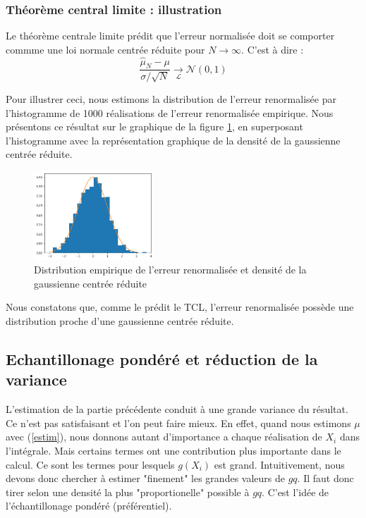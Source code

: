\documentclass{article}
\begin{document}
\subsubsection{Théorème central limite : illustration}

Le théorème centrale limite prédit que l'erreur normalisée doit se comporter commme une loi 
normale centrée réduite pour $N \rightarrow \infty$. C'est à dire : 
\[\frac {\hat{\mu}_{N}-\mu }{\sigma /{\sqrt {N}}}\underset{\mathcal{L} }{\longrightarrow}\mathcal{N} (0,1)\]

Pour illustrer ceci, nous estimons la distribution de l'erreur renormalisée
par l'histogramme de 1000 réalisations de l'erreur renormalisée empirique. Nous présentons
ce résultat sur le graphique de la figure \ref{TP1_MC_TCL}, en superposant l'histogramme avec la représentation graphique de la densité de la gaussienne centrée réduite.
\begin{figure}[ht]
\centering
\includegraphics[width=0.4\textwidth]{TP1/MC_brute_TCL.png}
\caption{Distribution empirique de l'erreur renormalisée et densité de la gaussienne centrée réduite}
\label{TP1_MC_TCL}
\end{figure}

Nous constatons que, comme le prédit le TCL, l'erreur renormalisée possède une distribution proche d'une gaussienne centrée réduite.



\subsection{Echantillonage pondéré et réduction de la variance}
L'estimation de la partie précédente conduit à une grande variance du résultat.
Ce n'est pas satisfaisant et l'on peut faire mieux. En effet, quand nous estimons 
$\mu$ avec (\ref{estim}), nous donnons autant d'importance a chaque réalisation
de $X_{i}$ dans l'intégrale. Mais certains termes ont une contribution plus
importante dans le calcul. Ce sont les termes pour lesquels
$g(X_{i})$ est grand. Intuitivement, nous devons donc chercher à estimer "finement" les grandes valeurs de $gq$. Il faut donc 
tirer selon une densité la plus "proportionelle" possible à $gq$. C'est l'idée de l'échantillonage pondéré (préférentiel).\\
\end{document}
